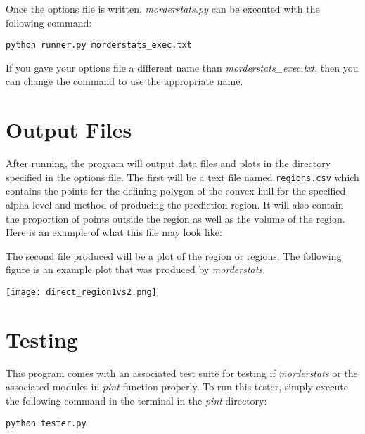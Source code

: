 \documentclass[11pt]{article}
\begin{document}
Once the options file is written, \textit{morderstats.py} can be executed with the following command:
\begin{center}
	\texttt{python runner.py morderstats\_exec.txt}
\end{center}

If you gave your options file a different name than \textit{morderstats\_exec.txt}, then you can change the command to use the appropriate name.

\section{Output Files}
After running, the program will output data files and plots in the directory specified in the options file. The first will be a text file named \texttt{regions.csv} which contains the points for the defining polygon of the convex hull for the specified alpha level and method of producing the prediction region. It will also contain the proportion of points outside the region as well as the volume of the region. Here is an example of what this file may look like:

\begin{framed}
	
\end{framed}

The second file produced will be a plot of the region or regions.
The following figure is an example plot that was produced by \textit{morderstats}

\begin{center}
\texttt{[image: direct\_region1vs2.png]}
\end{center}

\section{Testing}
This program comes with an associated test suite for testing if \textit{morderstats} or the associated modules in \textit{pint} function properly.
To run this tester, simply execute the following command in the terminal in the \textit{pint} directory:
\begin{center}
	\texttt{python tester.py}
\end{center}
\end{document}
